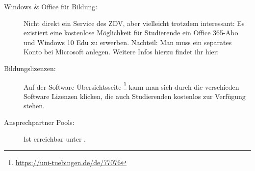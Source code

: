 \begin{description}
   \item[Windows \& Office für Bildung:] Nicht direkt ein Service des ZDV, aber vielleicht trotzdem interessant: Es existiert eine kostenlose Möglichkeit für Studierende ein Office 365-Abo und Windows 10 Edu zu erwerben. Nachteil: Man muss ein separates Konto bei Microsoft anlegen. Weitere Infos hierzu findet ihr hier:


  \item[Bildungslizenzen:] Auf der Software Übersichtsseite \footnote{\url{https://uni-tuebingen.de/de/77076}} kann man sich durch die verschieden Software Lizenzen klicken, die auch Studierenden kostenlos zur Verfügung stehen.

  \item[Ansprechpartner Pools:]
    Ist erreichbar unter .


\end{description}
